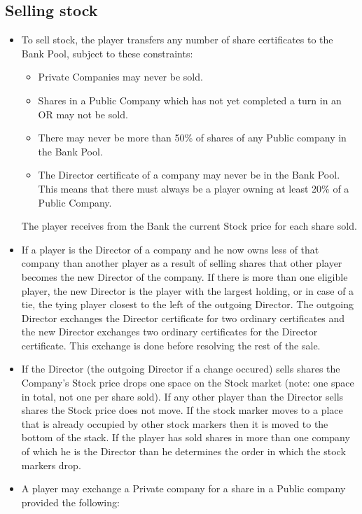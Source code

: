 \documentclass[a4paper,twocolumn]{article}
\begin{document}
\subsection{Selling stock}
\begin{itemize}
	\item To sell stock, the player transfers any number of share certificates
	to the Bank Pool, subject to these constraints:
	\begin{itemize}
		\item Private Companies may never be sold.
		\item Shares in a Public Company which has not yet completed a turn in
		an OR may not be sold.
		\item There may never be more than 50\% of shares of any Public company
		in the Bank Pool.
		\item The Director certificate of a company may never be in the Bank
		Pool. This means that there must always be a player owning at least 20\%
		of a Public Company.
	\end{itemize}
	The player receives from the Bank the current Stock price for each share
	sold.
	\item If a player is the Director of a company and he now owns less of that
	company than another player as a result of selling shares that other player
	becomes the new Director of the company. If there is more than one eligible
	player, the new Director is the player with the largest holding, or in case
	of a tie, the tying player closest to the left of the outgoing Director. The
	outgoing Director exchanges the Director certificate for two ordinary
	certificates and the new Director exchanges two ordinary certificates for
	the Director certificate. This exchange is done before resolving the rest of
	the sale.
	\item If the Director (the outgoing Director if a change occured) sells
	shares the Company's Stock price drops one space on the Stock market (note:
	one space in total, not one per share sold). If any other player than the
	Director sells shares the Stock price does not move. If the stock marker
	moves to a place that is already occupied by other stock markers then it is
	moved to the bottom of the stack. If the player has sold shares in more than
	one company of which he is the Director than he determines the order in
	which the stock markers drop.
	\item A player may exchange a Private company for a share in a Public
	company provided the following:
	\begin{itemize}

\end{itemize}
\end{itemize}
\end{document}
